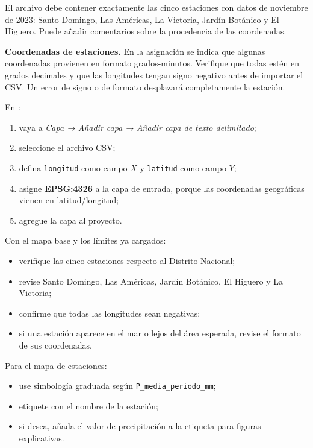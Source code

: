 \documentclass[11pt]{article}
\begin{document}
El archivo debe contener exactamente las cinco estaciones con datos de noviembre
de 2023: Santo Domingo, Las Américas, La Victoria, Jardín Botánico y El Higuero.
Puede añadir comentarios sobre la procedencia de las coordenadas.

\begin{infobox}
\textbf{Coordenadas de estaciones.}
En la asignación se indica que algunas coordenadas provienen en formato
grados-minutos. Verifique que todas estén en grados decimales y que las
longitudes tengan signo negativo antes de importar el CSV. Un error de signo o
de formato desplazará completamente la estación.
\end{infobox}


En \qgis{}:
\begin{enumerate}
  \item vaya a \emph{Capa → Añadir capa → Añadir capa de texto delimitado};
  \item seleccione el archivo CSV;
  \item defina \texttt{longitud} como campo $X$ y \texttt{latitud} como campo $Y$;
  \item asigne \textbf{EPSG:4326} a la capa de entrada, porque las coordenadas
        geográficas vienen en latitud/longitud;
  \item agregue la capa al proyecto.
\end{enumerate}


Con el mapa base y los límites ya cargados:
\begin{itemize}
  \item verifique las cinco estaciones respecto al Distrito Nacional;
  \item revise Santo Domingo, Las Américas, Jardín Botánico, El Higuero y
        La Victoria;
  \item confirme que todas las longitudes sean negativas;
  \item si una estación aparece en el mar o lejos del área esperada, revise el
        formato de sus coordenadas.
\end{itemize}


Para el mapa de estaciones:
\begin{itemize}
  \item use simbología graduada según \texttt{P\_media\_periodo\_mm};
  \item etiquete con el nombre de la estación;
  \item si desea, añada el valor de precipitación a la etiqueta para figuras
        explicativas.
\end{itemize}
\end{document}
